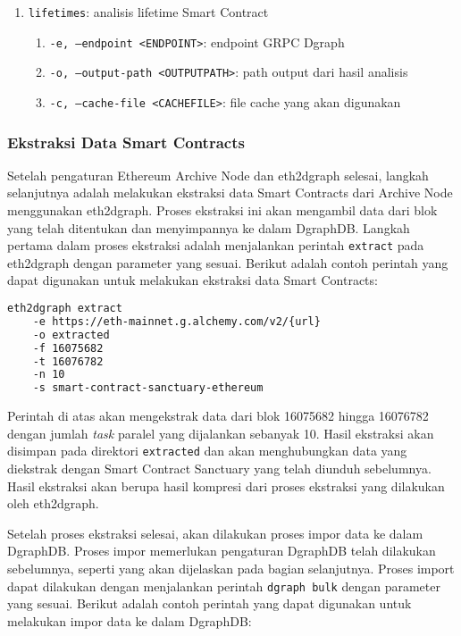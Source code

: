 \begin{enumerate}
\begin{enumerate}
\begin{enumerate}
        \end{enumerate}
        \item \texttt{lifetimes}: analisis lifetime Smart Contract
        \begin{enumerate}
            \item \texttt{-e, --endpoint <ENDPOINT>}: endpoint GRPC Dgraph
            \item \texttt{-o, --output-path <OUTPUT\textunderscore PATH>}: path output dari hasil analisis
            \item \texttt{-c, --cache-file <CACHE\textunderscore FILE>}: file cache yang akan digunakan
        \end{enumerate}
    \end{enumerate}
\end{enumerate}

\subsubsection{Ekstraksi Data Smart Contracts}

Setelah pengaturan Ethereum Archive Node dan eth2dgraph selesai, langkah selanjutnya adalah melakukan ekstraksi data Smart Contracts dari Archive Node menggunakan eth2dgraph. Proses ekstraksi ini akan mengambil data dari blok yang telah ditentukan dan menyimpannya ke dalam DgraphDB. Langkah pertama dalam proses ekstraksi adalah menjalankan perintah \texttt{extract} pada eth2dgraph dengan parameter yang sesuai. Berikut adalah contoh perintah yang dapat digunakan untuk melakukan ekstraksi data Smart Contracts:

\begin{lstlisting}[language=bash]
    eth2dgraph extract 
    -e https://eth-mainnet.g.alchemy.com/v2/{url}
    -o extracted 
    -f 16075682 
    -t 16076782 
    -n 10 
    -s smart-contract-sanctuary-ethereum
\end{lstlisting}

Perintah di atas akan mengekstrak data dari blok 16075682 hingga 16076782 dengan jumlah \textit{task} paralel yang dijalankan sebanyak 10. Hasil ekstraksi akan disimpan pada direktori \texttt{extracted} dan akan menghubungkan data yang diekstrak dengan Smart Contract Sanctuary yang telah diunduh sebelumnya. Hasil ekstraksi akan berupa hasil kompresi dari proses ekstraksi yang dilakukan oleh eth2dgraph. 

Setelah proses ekstraksi selesai, akan dilakukan proses impor data ke dalam DgraphDB. Proses impor memerlukan pengaturan DgraphDB telah dilakukan sebelumnya, seperti yang akan dijelaskan pada bagian selanjutnya. Proses import dapat dilakukan dengan menjalankan perintah \texttt{dgraph bulk} dengan parameter yang sesuai. Berikut adalah contoh perintah yang dapat digunakan untuk melakukan impor data ke dalam DgraphDB:

